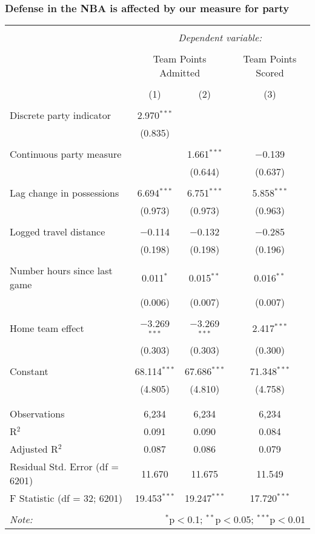 \documentclass{beamer}
\begin{document}
\begin{frame}   \frametitle{Defense in the NBA is affected by our measure for party}
  \tiny{  %
\begin{tabular}{@{\extracolsep{5pt}}lccc}  \\[-1.8ex]\hline  \hline \\[-1.8ex]   & \multicolumn{3}{c}{\textit{Dependent variable:}} \\  \cline{2-4}  \\[-1.8ex] & \multicolumn{2}{c}{Team Points Admitted} & Team Points Scored \\  \\[-1.8ex] & (1) & (2) & (3)\\  \hline \\[-1.8ex]   Discrete party indicator & 2.970$^{***}$ &  &  \\    & (0.835) &  &  \\    & & & \\   Continuous party measure &  & 1.661$^{***}$ & $-$0.139 \\    &  & (0.644) & (0.637) \\    & & & \\   Lag change in possessions & 6.694$^{***}$ & 6.751$^{***}$ & 5.858$^{***}$ \\    & (0.973) & (0.973) & (0.963) \\    & & & \\   Logged travel distance & $-$0.114 & $-$0.132 & $-$0.285 \\    & (0.198) & (0.198) & (0.196) \\    & & & \\   Number hours since last game & 0.011$^{*}$ & 0.015$^{**}$ & 0.016$^{**}$ \\    & (0.006) & (0.007) & (0.007) \\    & & & \\   Home team effect & $-$3.269$^{***}$ & $-$3.269$^{***}$ & 2.417$^{***}$ \\    & (0.303) & (0.303) & (0.300) \\    & & & \\   Constant & 68.114$^{***}$ & 67.686$^{***}$ & 71.348$^{***}$ \\    & (4.805) & (4.810) & (4.758) \\    & & & \\  \hline \\[-1.8ex]  Observations & 6,234 & 6,234 & 6,234 \\  R$^{2}$ & 0.091 & 0.090 & 0.084 \\  Adjusted R$^{2}$ & 0.087 & 0.086 & 0.079 \\  Residual Std. Error (df = 6201) & 11.670 & 11.675 & 11.549 \\  F Statistic (df = 32; 6201) & 19.453$^{***}$ & 19.247$^{***}$ & 17.720$^{***}$ \\  \hline  \hline \\[-1.8ex]  \textit{Note:}  & \multicolumn{3}{r}{$^{*}$p$<$0.1; $^{**}$p$<$0.05; $^{***}$p$<$0.01} \\  \end{tabular}    }
\end{frame}
\end{document}
